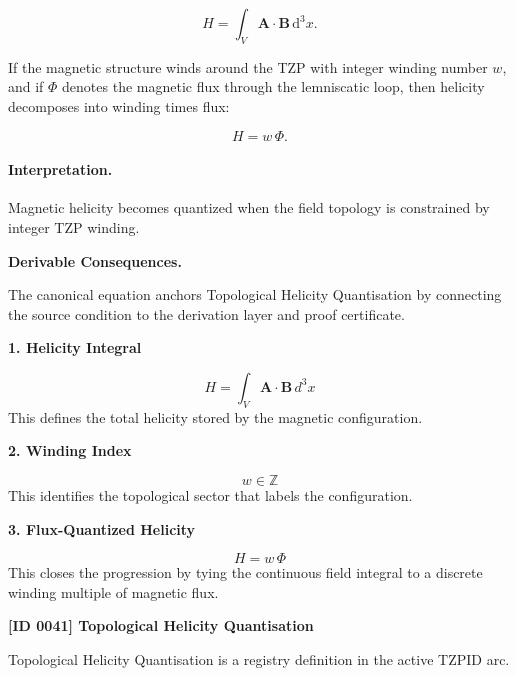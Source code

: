 \begin{equation}
H
=
\int_V
\mathbf{A}\cdot\mathbf{B}
\,\mathrm{d}^3x .
\end{equation}

If the magnetic structure winds around the TZP with integer winding number $w$, and if $\Phi$ denotes the magnetic flux through the lemniscatic loop, then helicity decomposes into winding times flux:

\begin{equation}
\boxed{
H=w\,\Phi .
}
\end{equation}

\paragraph{Interpretation.}
Magnetic helicity becomes quantized when the field topology is constrained by integer TZP winding.

\par\vspace{0.35em}
\noindent\textbf{Derivable Consequences.}\quad
\begingroup
\footnotesize
\raggedright
The canonical equation anchors Topological Helicity Quantisation by connecting the source condition to the derivation layer and proof certificate.
\par\endgroup

\noindent\textbf{1. Helicity Integral}\par
\[
H
=
\int_{V}\mathbf{A}\cdot\mathbf{B}\,d^{3}x
\]
\noindent This defines the total helicity stored by the magnetic configuration.\par
\noindent\textbf{2. Winding Index}\par
\[
w \in \mathbb{Z}
\]
\noindent This identifies the topological sector that labels the configuration.\par
\noindent\textbf{3. Flux-Quantized Helicity}\par
\[
H = w\,\Phi
\]
\noindent This closes the progression by tying the continuous field integral to a discrete winding multiple of magnetic flux.\par

\clearpage
\noindent\textbf{[ID 0041] Topological Helicity Quantisation}\par
\vspace{0.35em}
\begingroup\small
{}
Topological Helicity Quantisation is a registry definition in the active TZPID arc.

